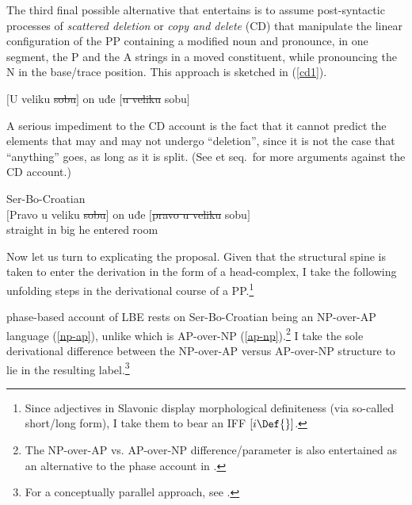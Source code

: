 \documentclass[output=paper]{langsci/langscibook}
\begin{document}
The third final possible alternative that \citet{Boskovic:2005} entertains is
to assume post-syntactic processes of \emph{scattered deletion} or \emph{copy
and delete} (CD) that manipulate the linear configuration of the PP containing
a modified noun and pronounce, in one segment, the P and the A strings in a
moved constituent, while pronouncing the N in the base/trace position.  This
approach is sketched in (\ref{cd1}).

\begin{exe}
	\ex $\big[$U veliku \sout{sobu}$\big]$ on uđe  $\big[$\sout{u veliku} {sobu}$\big]$ \hfill\citep[32n85]{Boskovic:2005}
	\label{cd1}
\end{exe}

A serious impediment to the CD account is the fact that it cannot predict the
elements that may and may not undergo \enquote{deletion}, since it is not the
case that \enquote{anything} goes, as long as it is split. (See
\citealt{Boskovic:2005} et seq.\ for more arguments against the CD
account.)

\begin{exe}
    \ex Ser-Bo-Croatian\\
    \gll * $\big[$Pravo u veliku \sout{sobu}$\big]$ on  uđe  $\big[$\sout{pravo u veliku} {sobu}$\big]$ \\
        {} \hphantom{$\big[$}straight in big {} he entered {} room \\
	\trans
\end{exe}

Now let us turn to explicating the proposal. Given that the structural spine is
taken to enter the derivation in the form of a head-complex, I take the
following unfolding steps in the derivational course of a PP.\footnote{Since
    adjectives in Slavonic display morphological definiteness (via so-called
short/long form), I take them to bear an \gls{IFF} $[i\Def{}]$.}

 phase-based account of \gls{LBE} rests on Ser-Bo-Croatian being an NP-over-AP
language (\ref{np-ap}), unlike  which is AP-over-NP
(\ref{ap-np}).\footnote{The NP-over-AP vs. AP-over-NP difference/parameter is
also entertained as an alternative to the phase account in
\citet{Boskovic:2005}.} I take the sole derivational difference between the
NP-over-AP versus AP-over-NP structure to lie in the resulting
label.\footnote{For a conceptually parallel approach, see
\citet{DonatiCecchetto:201}.}
\end{document}
